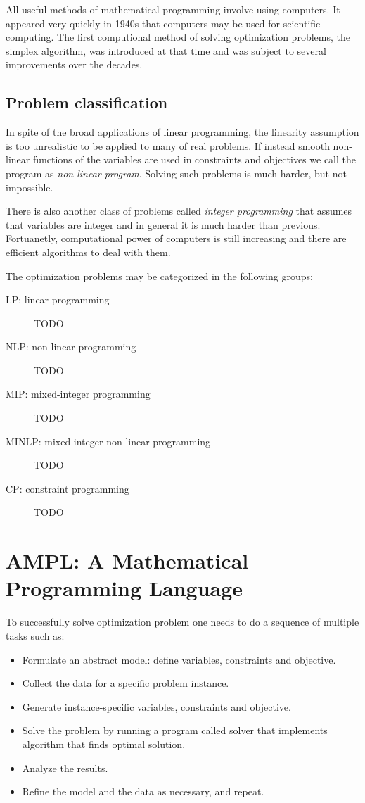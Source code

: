 All useful methods of mathematical programming involve using computers. It appeared very quickly in 1940s that computers may be used for scientific computing. The first computional method of solving optimization problems, the simplex algorithm, was introduced at that time and was subject to several improvements over the decades.

\subsection{Problem classification}
\label{ampl:classification}

In spite of the broad applications of linear programming, the linearity assumption is too unrealistic to be applied to many of real problems. If instead smooth non-linear functions of the variables are used in constraints and objectives we call the program as \emph{non-linear program}. Solving such problems is much harder, but not impossible.

There is also another class of problems called \emph{integer programming} that assumes that variables are integer and in general it is much harder than previous. Fortuanetly, computational power of computers is still increasing and there are efficient algorithms to deal with them.

The optimization problems may be categorized in the following groups:
\begin{description}
  \item[LP: linear programming] TODO
  \item[NLP: non-linear programming] TODO
  \item[MIP: mixed-integer programming] TODO
  \item[MINLP: mixed-integer non-linear programming] TODO
  \item[CP: constraint programming] TODO
\end{description}

\section{AMPL: A Mathematical Programming Language}

To successfully solve optimization problem one needs to do a sequence of multiple tasks such as:

\begin{itemize}
  \item Formulate an abstract model: define variables, constraints and objective.
  \item Collect the data for a specific problem instance.
  \item Generate instance-specific variables, constraints and objective.
  \item Solve the problem by running a program called solver that implements algorithm that finds optimal solution.
  \item Analyze the results.
  \item Refine the model and the data as necessary, and repeat.
\end{itemize}

